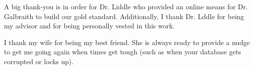 \label{acknowledgements}
A big thank-you is in order for Dr. Liddle who provided an online means for Dr. Galbraith to build our gold standard. Additionally, I thank Dr. Lddle for being my advisor and for being personally vested in this work. 

I thank my wife for being my best friend. She is always ready to provide a nudge to get me going again when times get tough (such as when your database gets corrupted or locks up).
